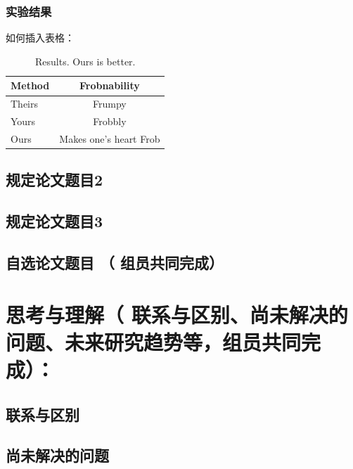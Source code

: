 \documentclass[12pt,AutoFakeBold]{article}
\newcommand{\revision}[1]{{\color{blue} #1}}
\begin{document}
\subsubsection{实验结果}

如何插入表格：

\begin{table}[h]
  \centering
  \begin{tabular}{@{}lc@{}}
    \hline    \hline

    Method & Frobnability \\
    \hline
    Theirs & Frumpy \\
        \hline

    Yours & Frobbly \\
        \hline

    Ours & Makes one's heart Frob\\
    \hline    \hline

  \end{tabular}
  \caption{Results.   Ours is better.}
  \label{tab:example}
\end{table}
\subsection{规定论文题目2}

\subsection{规定论文题目3}

\subsection{自选论文题目 （\revision{组员共同完成}）}




\section{思考与理解（\revision{联系与区别、尚未解决的问题、未来研究趋势等，组员共同完成}）：}

\subsection{联系与区别}

\subsection{尚未解决的问题}
\end{document}
